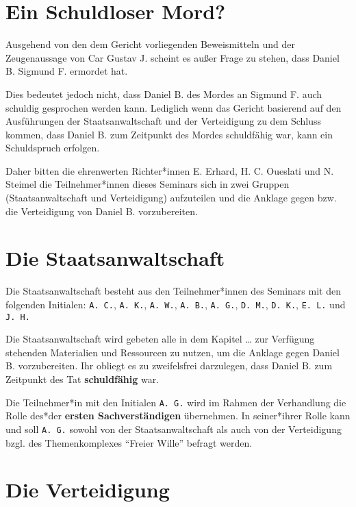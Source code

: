 \documentclass[
  a4paper,
]{report}
\begin{document}
\hypertarget{ein-schuldloser-mord}{%
\section{Ein Schuldloser Mord?}\label{ein-schuldloser-mord}}

Ausgehend von den dem Gericht vorliegenden Beweismitteln und der Zeugenaussage von Car Gustav J. scheint es außer Frage zu stehen, dass Daniel B. Sigmund F. ermordet hat.

Dies bedeutet jedoch nicht, dass Daniel B. des Mordes an Sigmund F. auch schuldig gesprochen werden kann. Lediglich wenn das Gericht basierend auf den Ausführungen der Staatsanwaltschaft und der Verteidigung zu dem Schluss kommen, dass Daniel B. zum Zeitpunkt des Mordes schuldfähig war, kann ein Schuldspruch erfolgen.

Daher bitten die ehrenwerten Richter*innen E. Erhard, H. C. Oueslati und N. Steimel die Teilnehmer*innen dieses Seminars sich in zwei Gruppen (Staatsanwaltschaft und Verteidigung) aufzuteilen und die Anklage gegen bzw. die Verteidigung von Daniel B. vorzubereiten.

\hypertarget{die-staatsanwaltschaft}{%
\section{Die Staatsanwaltschaft}\label{die-staatsanwaltschaft}}

Die Staatsanwaltschaft besteht aus den Teilnehmer*innen des Seminars mit den folgenden Initialen: \texttt{A.\ C.}, \texttt{A.\ K.}, \texttt{A.\ W.}, \texttt{A.\ B.}, \texttt{A.\ G.}, \texttt{D.\ M.}, \texttt{D.\ K.}, \texttt{E.\ L.} und \texttt{J.\ H.}

Die Staatsanwaltschaft wird gebeten alle in dem Kapitel \ldots{} zur Verfügung stehenden Materialien und Ressourcen zu nutzen, um die Anklage gegen Daniel B. vorzubereiten. Ihr obliegt es zu zweifelsfrei darzulegen, dass Daniel B. zum Zeitpunkt des Tat \textbf{schuldfähig} war.

Die Teilnehmer*in mit den Initialen \texttt{A.\ G.} wird im Rahmen der Verhandlung die Rolle des*der \textbf{ersten Sachverständigen} übernehmen. In seiner*ihrer Rolle kann und soll \texttt{A.\ G.} sowohl von der Staatsanwaltschaft als auch von der Verteidigung bzgl. des Themenkomplexes ``Freier Wille'' befragt werden.

\hypertarget{die-verteidigung}{%
\section{Die Verteidigung}\label{die-verteidigung}}
\end{document}
